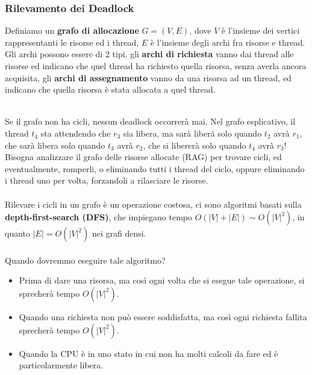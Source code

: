 \documentclass[12pt, letterpaper]{article}
\newcommand{\acc}{\\\hphantom{}\\}
\begin{document}
\subsubsection{Rilevamento dei Deadlock}
Definiamo un \textbf{grafo di allocazione} \(G=(V,E)\), dove \(V\) è l'insieme dei vertici rappresentanti 
le risorse ed i thread, \(E\) è l'insieme degli archi fra  risorse e thread. Gli archi possono essere di 2 tipi, 
gli \textbf{archi di richiesta} vanno dai thread alle risorse ed indicano che quel thread ha richiesto quella risorsa, 
senza averla ancora acquisita, gli \textbf{archi di assegnamento} vanno da una risorsa ad un thread, ed indicano che 
quella risorsa è stata allocata a quel thread.
\begin{figure}[h]
\end{figure}
\\Se il grafo non ha cicli, nessun deadlock occorrerà mai. Nel grafo esplicativo, il thread \(t_4\) sta attendendo 
che \(r_3\) sia libera, ma sarà liberà solo quando \(t_2\) avrà \(r_1\), che sarà libera solo quando \(t_3\) avrà 
\(r_2\), che si libererà solo quando \(t_4\) avrà \(r_3\)! Bisogna analizzare il grafo delle risorse 
allocate (RAG) per trovare cicli, ed eventualmente, romperli, o eliminando tutti i thread del ciclo, oppure eliminando 
i thread uno per volta, forzandoli a rilasciare le risorse. \acc 
Rilevare i cicli in un grafo è un operazione costosa, ci sono algoritmi basati sulla \textbf{depth-first-search (DFS)}, 
che impiegano tempo \(O(|V|+|E|)\sim O(|V|^2)\), in quanto \(|E|=O(|V|^2)\) nei grafi densi.
\acc Quando dovremmo eseguire tale algoritmo? \begin{itemize}
    \item Prima di dare una risorsa, ma così ogni volta che si esegue tale operazione, si sprecherà tempo \(O(|V|^2)\).
    \item Quando una richiesta non può essere soddisfatta, ma così ogni richiesta fallita sprecherà tempo \(O(|V|^2)\).
    \item Quando la CPU è in uno stato in cui non ha molti calcoli da fare ed è particolarmente libera.
\end{itemize}  
\end{document}
